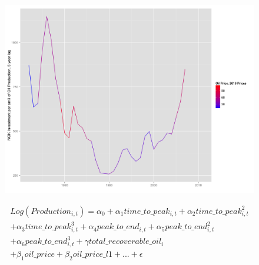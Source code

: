 \documentclass{beamer}
\begin{document}

\begin{frame}[plain]
	\begin{figure}
	\includegraphics[width=1\textwidth]{invest_per_prod_l5.png}
	\end{figure}
\end{frame}


\begin{frame}[plain]
	\begin{multline}
	\nonumber  Log(Production_{i,t})=\alpha_0 + \alpha_1 time\_to\_peak_{i,t} + \alpha_2 time\_to\_peak_{i,t}^2 \\
	 + \alpha_3 time\_to\_peak_{i,t}^3  + \alpha_4 peak\_to\_end_{i,t} + \alpha_5 peak\_to\_end_{i,t}^2 \\
	 + \alpha_6 peak\_to\_end_{i,t}^3 + \gamma total\_recoverable\_oil_i \\
	 + \beta_1 oil\_price + \beta_2 oil\_price\_l1 + ...+ \epsilon
	\end{multline}
\end{frame}
\end{document}

